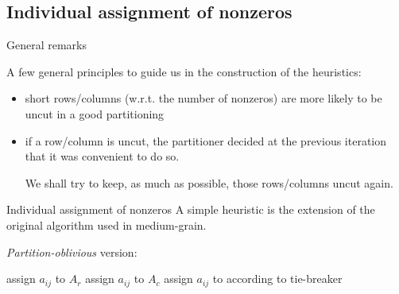 \subsection{Individual assignment of nonzeros}

\begin{frame}{General remarks}

A few general principles to guide us in the construction of the heuristics:

\begin{itemize}\itemsep=0.5cm
	\item short rows/columns (w.r.t. the number of nonzeros) are more likely to be uncut in a good partitioning 
	\item if a row/column is uncut, the partitioner decided at the previous iteration that it was convenient to do so. 
		
		We shall try to keep, as much as possible, those rows/columns uncut again.

\end{itemize}


\end{frame}

\begin{frame}{Individual assignment of nonzeros}
A simple heuristic is the extension of the original algorithm used in medium-grain.

\emph{Partition-oblivious} version:

\begin{algorithm}[H]
	\begin{algorithmic}
		\State assign $a_{ij}$ to $A_r$
		\State assign $a_{ij}$ to $A_c$
		\Else
		\State assign $a_{ij}$ to according to tie-breaker
		\EndIf
		\EndFor
	\end{algorithmic}
\end{algorithm}
\end{frame}

